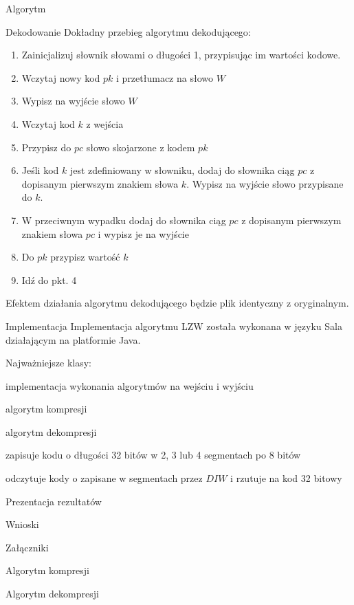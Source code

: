 \documentclass{article}
\begin{document}
\begin{section}{Algorytm}
\begin{subsection}{Dekodowanie}
      Dokładny przebieg algorytmu dekodującego:
      \begin{enumerate}
	\item Zainicjalizuj słownik słowami o długości 1, przypisując im wartości kodowe.
	\item Wczytaj nowy kod $pk$ i przetłumacz na słowo $W$
	\item Wypisz na wyjście słowo $W$
	\item Wczytaj kod $k$ z wejścia 
	\item Przypisz do $pc$ słowo skojarzone z kodem $pk$
	\item Jeśli kod $k$ jest zdefiniowany w słowniku, dodaj do słownika ciąg $pc$ z dopisanym pierwszym znakiem słowa $k$. 
	  Wypisz na wyjście słowo przypisane do $k$.
	\item W przeciwnym wypadku dodaj do słownika ciąg $pc$ z dopisanym pierwszym znakiem słowa $pc$ i wypisz je na wyjście
	\item Do $pk$ przypisz wartość $k$
	\item Idź do pkt. 4
      \end{enumerate}
      Efektem działania algorytmu dekodującego będzie plik identyczny z oryginalnym.
    \end{subsection}
  \end{section}
  \begin{section}{Implementacja}
      Implementacja algorytmu LZW została wykonana w języku Sala działającym na platformie Java.

      Najważniejsze klasy:
      \begin{description}[leftmargin=8em,style=nextline]
	\item[LZW] implementacja wykonania algorytmów na wejściu i wyjściu
	\item[MutableCompression] algorytm kompresji
	\item[MutableDecompression] algorytm dekompresji
	\item[DummyIntWriter] zapisuje kodu o długości 32 bitów w 2, 3 lub 4 segmentach po 8 bitów
	\item[DummyIntReader] odczytuje kody o zapisane w segmentach przez $DIW$ i rzutuje na kod 32 bitowy
      \end{description}

  \end{section}
  \begin{section}{Prezentacja rezultatów}
  \end{section}
  \begin{section}{Wnioski}
  \end{section}
  \begin{section}{Załączniki}
  \appendix
    \begin{section}{Algorytm kompresji}
      
    \end{section}
    \begin{section}{Algorytm dekompresji}
      
    \end{section}
  \end{section}
\end{document}
